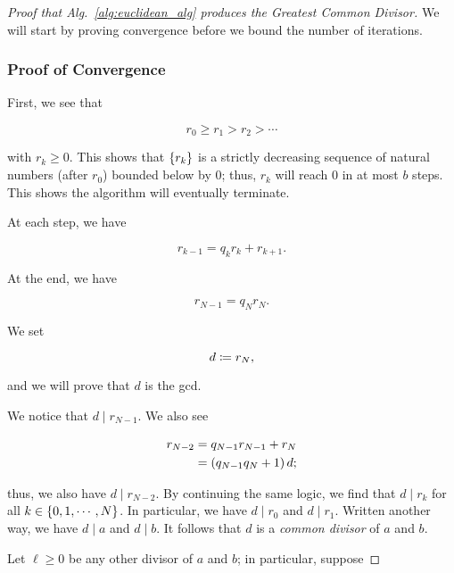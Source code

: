 \begin{proof}[Proof that Alg.~\ref{alg:euclidean_alg} produces the
    Greatest Common Divisor]

We will start by proving convergence before we bound the number
of iterations.

\subsubsection*{Proof of Convergence}
First, we see that

\begin{equation}
    r_{0} \ge r_{1} > r_{2} > \cdots
\end{equation}

\noindent
with $r_{k}\ge0$.
This shows that $\left\{ r_{k} \right\}$ is a strictly decreasing sequence of natural
numbers (after $r_{0}$) bounded below by $0$;
thus, $r_{k}$ will reach $0$ in at most $b$ steps.
This shows the algorithm will eventually terminate.

At each step, we have

\begin{equation}
    r_{k-1} = q_{k}r_{k} + r_{k+1}.
\end{equation}

\noindent
At the end, we have

\begin{equation}
    r_{N-1} = q_{N}r_{N}.
\end{equation}

\noindent
We set

\begin{equation}
    d \coloneqq{} r_{N},
\end{equation}

\noindent
and we will prove that $d$ is the gcd.

We notice that $d \mid r_{N-1}$.
We also see

\begin{align}
    r_{N-2} &= q_{N-1}r_{N-1} + r_{N} \nonumber\\
        &= \left( q_{N-1}q_{N} + 1 \right)d;
\end{align}

\noindent
thus, we also have $d \mid r_{N-2}$.
By continuing the same logic, we find that $d \mid r_{k}$ for all
$k\in\left\{ 0, 1, \cdots, N \right\}$.
In particular, we have $d \mid r_{0}$ and $d \mid r_{1}$.
Written another way, we have $d \mid a$ and $d \mid b$.
It follows that $d$ is a \emph{common divisor} of $a$ and $b$.

Let $\ell\ge0$ be any other divisor of $a$ and $b$;
in particular, suppose


\end{proof}
